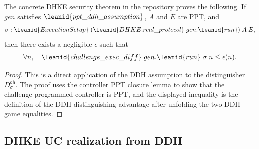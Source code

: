 \begin{proposition}
The concrete DHKE security theorem in the repository
proves the following.  If \(gen\) satisfies
\(\leanid{ppt\_ddh\_assumption}\), \(A\) and \(E\) are PPT, and
\[
  \sigma :
    \leanid{ExecutionSetup}\;
      (\leanid{DHKE.real\_protocol}\;gen.\leanid{run})\;A\;E,
\]
then there exists a negligible \(\epsilon\) such that
\[
  \forall n,\quad
  \leanid{challenge\_exec\_diff}\;gen.\leanid{run}\;\sigma\;n
    \le \epsilon(n).
\]
\end{proposition}

\begin{proof}
This is a direct application of the DDH assumption to the distinguisher
\(D^{\mathsf{dh}}_{\sigma}\).  The proof uses the controller PPT closure lemma
to show that the
challenge-programmed controller is PPT, and the displayed inequality is the
definition of the DDH distinguishing advantage after unfolding the two DDH
game equalities.
\end{proof}

\subsection{DHKE UC realization from DDH}

